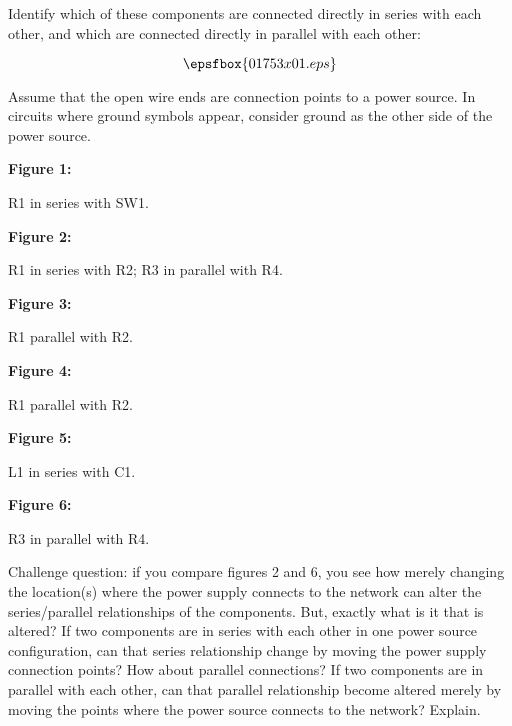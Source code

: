 

Identify which of these components are connected directly in series with each other, and which are connected directly in parallel with each other:

$$\epsfbox{01753x01.eps}$$

Assume that the open wire ends are connection points to a power source.  In circuits where ground symbols appear, consider ground as the other side of the power source.  







\noindent
{\bf Figure 1:}

R1 in series with SW1.

\vskip 10pt

\noindent
{\bf Figure 2:}

R1 in series with R2; R3 in parallel with R4.

\vskip 10pt

\noindent
{\bf Figure 3:}

R1 parallel with R2.

\vskip 10pt

\noindent
{\bf Figure 4:}

R1 parallel with R2.

\vskip 10pt

\noindent
{\bf Figure 5:}

L1 in series with C1.

\vskip 10pt

\noindent
{\bf Figure 6:}

R3 in parallel with R4.

\vskip 10pt

Challenge question: if you compare figures 2 and 6, you see how merely changing the location(s) where the power supply connects to the network can alter the series/parallel relationships of the components.  But, exactly what is it that is altered?  If two components are in series with each other in one power source configuration, can that series relationship change by moving the power supply connection points?  How about parallel connections?  If two components are in parallel with each other, can that parallel relationship become altered merely by moving the points where the power source connects to the network?  Explain.

